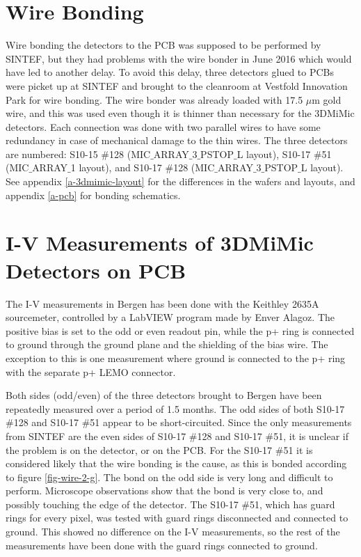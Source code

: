 \documentclass[../main/thesis.tex]{subfiles}
\begin{document}
\section{Wire Bonding}
Wire bonding the detectors to the PCB was supposed to be performed by SINTEF, but they had problems with the wire bonder in June 2016 which would have led to another delay. To avoid this delay, three detectors glued to PCBs were picket up at SINTEF and brought to the cleanroom at Vestfold Innovation Park for wire bonding. The wire bonder was already loaded with 17.5 $\mu$m gold wire, and this was used even though it is thinner than necessary for the 3DMiMic detectors. Each connection was done with two parallel wires to have some redundancy in case of mechanical damage to the thin wires. The three detectors are numbered: S10-15 $\#$128 (MIC$\_$ARRAY$\_$3$\_$PSTOP$\_$L layout), S10-17 $\#$51 (MIC$\_$ARRAY$\_$1 layout), and S10-17 $\#$128 (MIC$\_$ARRAY$\_$3$\_$PSTOP$\_$L layout). See appendix \ref{a-3dmimic-layout} for the differences in the wafers and layouts, and appendix \ref{a-pcb} for bonding schematics. 

\section{I-V Measurements of 3DMiMic Detectors on PCB}
\label{3dmimic-iv-pcb}

The I-V measurements in Bergen has been done with the Keithley 2635A sourcemeter, controlled by a LabVIEW program made by Enver Alagoz. The positive bias is set to the odd or even readout pin, while the p+ ring is connected to ground through the ground plane and the shielding of the bias wire. The exception to this is one measurement where ground is connected to the p+ ring with the separate p+ LEMO connector. 

Both sides (odd/even) of the three detectors brought to Bergen have been repeatedly measured over a period of 1.5 months. The odd sides of both S10-17 \#128 and S10-17 \#51 appear to be short-circuited. Since the only measurements from SINTEF are the even sides of S10-17 \#128 and S10-17 \#51, it is unclear if the problem is on the detector, or on the \gls{PCB}. For the S10-17 \#51 it is considered likely that the wire bonding is the cause, as this is bonded according to figure \ref{fig-wire-2-g}. The bond on the odd side is very long and difficult to perform. Microscope observations show that the bond is very close to, and possibly touching the edge of the detector. The S10-17 \#51, which has guard rings for every pixel, was tested with guard rings disconnected and connected to ground. This showed no difference on the I-V measurements, so the rest of the measurements have been done with the guard rings connected to ground. 
\end{document}
